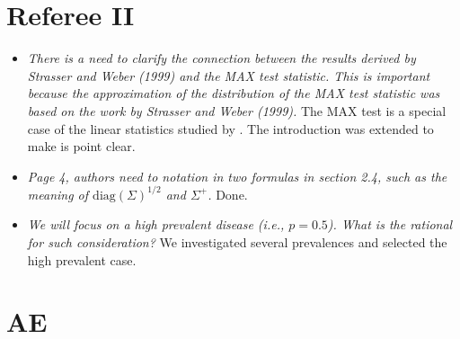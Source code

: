 \documentclass{article}
\begin{document}
\section{Referee II}
\begin{itemize}
\item
\textit{
There is a need to clarify the connection between the results derived 
by Strasser and Weber (1999) and the MAX test statistic. This is 
important because the approximation of the distribution of the MAX 
test statistic was based on the work by Strasser and Weber (1999).}
The MAX test is a special case of the linear statistics studied
by \cite{StrasserWeber1999}. The introduction was extended to make
is point clear.

\item
\textit{Page 4, authors need to notation in two formulas in section 2.4, 
such as the meaning of $\text{diag}(\Sigma)^{1/2}$ and $\Sigma^+$.}
Done.

\item
\textit{
We will focus on a high prevalent disease (i.e., $p=0.5$). 
What is the rational for such consideration?}
We investigated several prevalences and selected the high prevalent case.

\end{itemize}

\section{AE}
\end{document}
